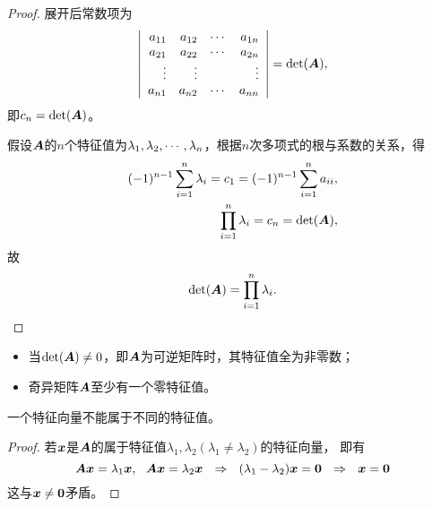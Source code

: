 \begin{proof}
  展开后常数项为
  $$
  \left|
    \begin{array}{rrrr}
      a_{11}&a_{12}&\cdots&a_{1n}\\
      a_{21}&a_{22}&\cdots&a_{2n}\\
      \vdots&\vdots&&\vdots\\
      a_{n1}&a_{n2}&\cdots&a_{nn}
    \end{array}
  \right|=\det(\boldsymbol{A}),
  $$
  即$c_n=\det(\boldsymbol{A})$。

  假设$\boldsymbol{A}$的$n$个特征值为$\lambda_1,\lambda_2,\cdots,\lambda_n$，根据$n$次多项式的根与系数的关系，得
  $$
  \begin{aligned}
    (-1)^{n-1}\sum_{i=1}^n\lambda_i = c_1 = (-1)^{n-1}\sum_{i=1}^na_{ii},\\
    \prod_{i=1}^n\lambda_i=c_n=\det(\boldsymbol{A}),
  \end{aligned}
  $$
  故
  $$
  \det(\boldsymbol{A})=\prod_{i=1}^n\lambda_i.
  $$
  
\end{proof}

\begin{zhu}
\begin{itemize}
\item 当$\det(\boldsymbol{A})\ne 0$，即$\boldsymbol{A}$为可逆矩阵时，其特征值全为非零数；
\item 奇异矩阵$\boldsymbol{A}$至少有一个零特征值。      
\end{itemize}
\end{zhu}





\begin{dingli}
  一个特征向量不能属于不同的特征值。
\end{dingli}
\begin{proof}

  若${\boldsymbol{x}}$是$\boldsymbol{A}$的属于特征值$\lambda_1,\lambda_2(\lambda_1\ne\lambda_2)$的特征向量，
  即有
  $$
  \boldsymbol{A}{\boldsymbol{x}}=\lambda_1{\boldsymbol{x}}, ~~ \boldsymbol{A}{\boldsymbol{x}}=\lambda_2{\boldsymbol{x}}
  ~~\Rightarrow~~ (\lambda_1-\lambda_2){\boldsymbol{x}}=\boldsymbol{0}
  ~~\Rightarrow~~ {\boldsymbol{x}}=\boldsymbol{0}
  $$
  这与${\boldsymbol{x}}\ne\boldsymbol{0}$矛盾。
\end{proof}





